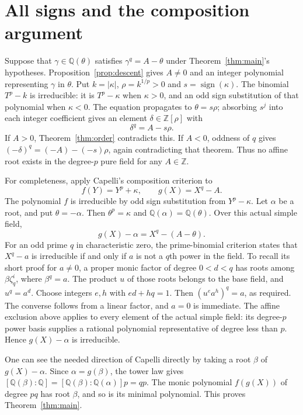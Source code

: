 \documentclass[11pt,letterpaper]{article}
\theoremstyle{remark}\newtheorem{remark}[theorem]{Remark}
\newcommand{\Q}{\mathbb Q}
\newcommand{\Z}{\mathbb Z}
\begin{document}
\section{All signs and the composition argument}\label{sec:assembly}

Suppose that $\gamma\in\Q(\theta)$ satisfies $\gamma^q=A-\theta$ under
Theorem~\ref{thm:main}'s hypotheses. Proposition~\ref{prop:descent} gives
$A\ne0$ and an integer polynomial representing $\gamma$ in $\theta$.
Put $k=|\kappa|$, $\rho=k^{1/p}>0$ and $s=\operatorname{sign}(\kappa)$.
The binomial $T^p-k$ is irreducible: it is $T^p-\kappa$ when $\kappa>0$,
and an odd sign substitution of that polynomial when $\kappa<0$.
The equation propagates to $\theta=s\rho$; absorbing $s^j$ into each
integer coefficient gives an element $\delta\in\Z[\rho]$ with
\[
                             \delta^q=A-s\rho.
\]
If $A>0$, Theorem~\ref{thm:order} contradicts this. If $A<0$, oddness of
$q$ gives $(-\delta)^q=(-A)-(-s)\rho$, again contradicting that theorem.
Thus no affine root exists in the degree-$p$ pure field for any $A\in\Z$.

For completeness, apply Capelli's composition criterion to
\[
                 f(Y)=Y^p+\kappa,\qquad g(X)=X^q-A.
\]
The polynomial $f$ is irreducible by odd sign substitution from
$Y^p-\kappa$. Let $\alpha$ be a root, and put $\theta=-\alpha$.
Then $\theta^p=\kappa$ and $\Q(\alpha)=\Q(\theta)$.
Over this actual simple field,
\[
                       g(X)-\alpha=X^q-(A-\theta).
\]
For an odd prime $q$ in characteristic zero, the prime-binomial criterion
states that $X^q-a$ is irreducible if and only if $a$ is not a $q$th power
in the field. To recall its short proof for $a\ne0$, a proper monic factor
of degree $0<d<q$ has roots among $\beta\zeta_q^i$, where $\beta^q=a$.
The product $u$ of those roots belongs to the base field, and $u^q=a^d$.
Choose integers $e,h$ with $ed+hq=1$. Then $(u^e a^h)^q=a$, as required.
The converse follows from a linear factor, and $a=0$ is immediate.
The affine exclusion above applies to every element of the actual simple
field: its degree-$p$ power basis supplies a rational polynomial
representative of degree less than $p$. Hence $g(X)-\alpha$ is irreducible.

One can see the needed direction of Capelli directly by taking a root
$\beta$ of $g(X)-\alpha$. Since $\alpha=g(\beta)$, the tower law gives
$[\Q(\beta):\Q]=[\Q(\beta):\Q(\alpha)]p=qp$.
The monic polynomial $f(g(X))$ of degree $pq$ has root $\beta$, and so is
its minimal polynomial. This proves Theorem~\ref{thm:main}.
\end{document}
